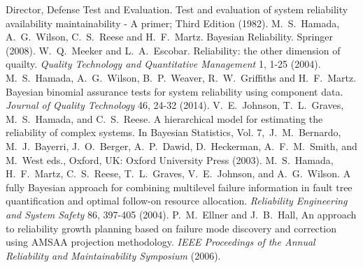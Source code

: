 \documentclass[12pt]{article}
\begin{document}
\begin{thebibliography}{99}
 Director, Defense Test and Evaluation. Test and evaluation of system reliability availability maintainability - A primer; Third Edition (1982).
 M.\ S.\ Hamada, A.\ G.\ Wilson, C.\ S.\ Reese and H.\ F.\ Martz. Bayesian Reliability. Springer (2008).
 W.\ Q.\ Meeker and L.\ A.\ Escobar. Reliability: the other dimension of quailty. \textit{Quality Technology and Quantitative Management} 1, 1-25 (2004).
 M.\ S.\ Hamada, A.\ G.\ Wilson, B.\ P.\ Weaver, R.\ W.\ Griffiths and H.\ F.\ Martz. Bayesian binomial assurance tests for system reliability using component data. \textit{Journal of Quality Technology} 46, 24-32 (2014).
 V.\ E.\ Johnson, T.\ L.\ Graves, M.\ S.\ Hamada, and C.\ S.\ Reese. A hierarchical model for estimating the reliability of complex systems. In Bayesian Statistics, Vol. 7,\ J.\ M.\ Bernardo, M.\ J.\ Bayerri, J.\ O.\ Berger, A.\ P.\ Dawid, D.\ Heckerman, A.\ F.\ M.\ Smith, and M.\ West eds., Oxford, UK: Oxford University Press (2003).
 M.\ S.\ Hamada, H.\ F.\ Martz, C.\ S.\ Reese, T.\ L.\ Graves, V.\ E.\ Johnson, and A.\ G.\ Wilson. A fully Bayesian approach
for combining multilevel failure information in fault tree quantification and optimal follow-on resource allocation. \textit{Reliability Engineering and System Safety} 86, 397-405 (2004).
 P.\ M.\ Ellner and J.\ B.\ Hall, An approach to reliability growth planning based on failure mode discovery and correction using AMSAA projection methodology. \textit{IEEE Proceedings of the Annual Reliability and Maintainability Symposium} (2006).
\end{thebibliography}
\end{document}
